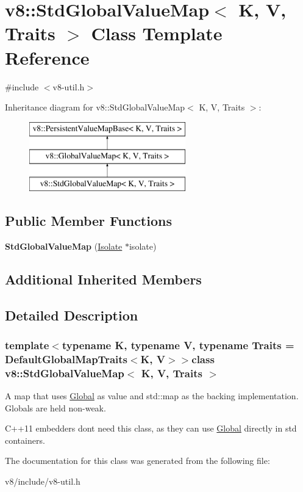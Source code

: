 \hypertarget{classv8_1_1StdGlobalValueMap}{}\section{v8\+:\+:Std\+Global\+Value\+Map$<$ K, V, Traits $>$ Class Template Reference}
\label{classv8_1_1StdGlobalValueMap}


{\ttfamily \#include $<$v8-\/util.\+h$>$}

Inheritance diagram for v8\+:\+:Std\+Global\+Value\+Map$<$ K, V, Traits $>$\+:\begin{figure}[H]
\begin{center}
\leavevmode
\includegraphics[height=3.000000cm]{classv8_1_1StdGlobalValueMap}
\end{center}
\end{figure}
\subsection*{Public Member Functions}
\begin{DoxyCompactItemize}
\item 
\hypertarget{classv8_1_1StdGlobalValueMap_af1025915a269b8b37af93ffc2ad5c3b1}{}{\bfseries Std\+Global\+Value\+Map} (\hyperlink{classv8_1_1Isolate}{Isolate} $\ast$isolate)\label{classv8_1_1StdGlobalValueMap_af1025915a269b8b37af93ffc2ad5c3b1}

\end{DoxyCompactItemize}
\subsection*{Additional Inherited Members}


\subsection{Detailed Description}
\subsubsection*{template$<$typename K, typename V, typename Traits = Default\+Global\+Map\+Traits$<$\+K, V$>$$>$class v8\+::\+Std\+Global\+Value\+Map$<$ K, V, Traits $>$}

A map that uses \hyperlink{classv8_1_1Global}{Global} as value and std\+::map as the backing implementation. Globals are held non-\/weak.

C++11 embedders don\textquotesingle{}t need this class, as they can use \hyperlink{classv8_1_1Global}{Global} directly in std containers. 

The documentation for this class was generated from the following file\+:\begin{DoxyCompactItemize}
\item 
v8/include/v8-\/util.\+h\end{DoxyCompactItemize}
